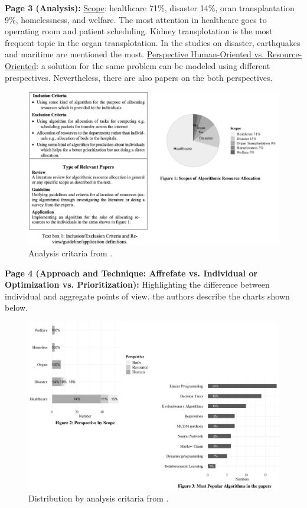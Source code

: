     \textbf{Page 3 (Analysis):}
    \underline{Scope}: healthcare 71\%, disaster 14\%, oran transplantation 9\%, homelessness, and welfare. The most attention in healthcare goes to operating room and patient scheduling. Kidney transplotation is the most frequent topic in the organ transplotation. In the studies on disaster, earthquakes and maritime are mentioned the most. \underline{Perspective Human-Oriented vs. Resource-Oriented}: a solution for the same problem can be modeled using different prespectives. Nevertheless, there are also papers on the both perspectives.
    \begin{figure}[H]
        \centering
        \includegraphics[width=1\textwidth]{figures/0017_AR01GB23/fig2.png}
        \caption{Analysis critaria from \cite{x121}.}
        \label{fig2:0017_AR01GB23}
    \end{figure}

    \textbf{Page 4 (Approach and Technique: Affrefate vs. Individual or Optimization vs. Prioritization):}
    Highlighting the difference between individual and aggregate points of view. the authors describe the charts shown below.
    \begin{figure}[H]
        \centering
        \includegraphics[width=1\textwidth]{figures/0017_AR01GB23/fig3.png}
        \caption{Distribution by analysis critaria from \cite{x121}.}
        \label{fig3:0017_AR01GB23}
    \end{figure}

